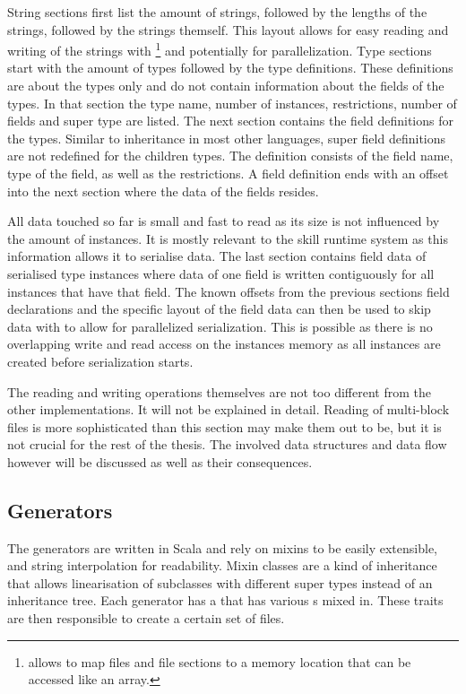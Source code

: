 \documentclass[thesis]{subfiles}
\begin{document}
    String sections first list the amount of strings, followed by the lengths of the strings, followed by the strings themself.
    This layout allows for easy reading and writing of the strings with \footnote{
       allows to map files and file sections to a memory location that can be accessed like an array.
    } and potentially for parallelization.
    Type sections start with the amount of types followed by the type definitions.
    These definitions are about the types only and do not contain information about the fields of the types.
    In that section the type name, number of instances, restrictions, number of fields and super type are listed.
    The next section contains the field definitions for the types.
    Similar to inheritance in most other languages, super field definitions are not redefined for the children types.
    The definition consists of the field name, type of the field, as well as the restrictions.
    A field definition ends with an offset into the next section where the data of the fields resides.
    \autocite{skill-tr}

    All data touched so far is small and fast to read as its size is not influenced by the amount of instances.
    It is mostly relevant to the \gls{skill} runtime system as this information allows it to serialise data.
    The last section contains field data of serialised type instances where data of one field is written contiguously for all instances that have that field.
    The known offsets from the previous sections field declarations and the specific layout of the field data can then be used to skip data with  to allow for parallelized serialization.
    This is possible as there is no overlapping write and read access on the instances memory as all instances are created before serialization starts.
    \autocite{skill-tr}

    The reading and writing  operations themselves are not too different from the other implementations.
    It will not be explained in detail.
    Reading of multi-block files is more sophisticated than this section may make them out to be, but it is not crucial for the rest of the thesis.
    The involved data structures and data flow however will be discussed as well as their consequences.

  \subsection{Generators}
    The generators are written in Scala and rely on mixins to be easily extensible, and string interpolation for readability.
    Mixin classes are a kind of inheritance that allows linearisation of subclasses with different super types instead of an inheritance tree\autocite[117f.]{oop-inter}.
    Each generator has a   that has various s mixed in.
    These traits are then responsible to create a certain set of files.
\end{document}
